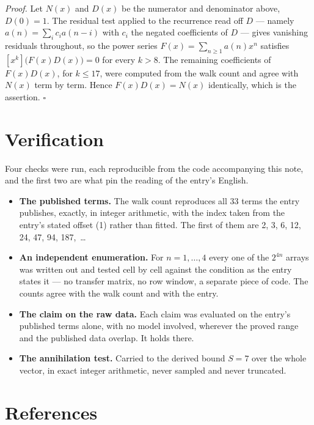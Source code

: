 \documentclass[11pt]{article}
\theoremstyle{definition}
\begin{document}
{\itshape Proof.} Let $N(x)$ and $D(x)$ be the numerator and denominator above, $D(0)=1$. The residual test applied to the recurrence read off $D$ --- namely $a(n) = \sum_i c_i a(n-i)$ with $c_i$ the negated coefficients of $D$ --- gives vanishing residuals throughout, so the power series $F(x)=\sum_{n\ge 1}a(n)x^n$ satisfies $[x^k]\bigl(F(x)D(x)\bigr) = 0$ for every $k > 8$. The remaining coefficients of $F(x)D(x)$, for $k \le 17$, were computed from the walk count and agree with $N(x)$ term by term. Hence $F(x)D(x) = N(x)$ identically, which is the assertion. $\square$

\section{Verification}

Four checks were run, each reproducible from the code accompanying this note, and the first two are what pin the reading of the entry's English.

\begin{itemize}

\item {\bfseries The published terms.} The walk count reproduces all 33 terms the entry publishes, exactly, in integer arithmetic, with the index taken from the entry's stated offset (1) rather than fitted. The first of them are 2, 3, 6, 12, 24, 47, 94, 187,~\dots

\item {\bfseries An independent enumeration.} For $n = 1,\dots,4$ every one of the $2^{4n}$ arrays was written out and tested cell by cell against the condition as the entry states it --- no transfer matrix, no row window, a separate piece of code. The counts agree with the walk count and with the entry.

\item {\bfseries The claim on the raw data.} Each claim was evaluated on the entry's published terms alone, with no model involved, wherever the proved range and the published data overlap. It holds there.

\item {\bfseries The annihilation test.} Carried to the derived bound $S = 7$ over the whole vector, in exact integer arithmetic, never sampled and never truncated.

\end{itemize}

\section{References}
\end{document}
